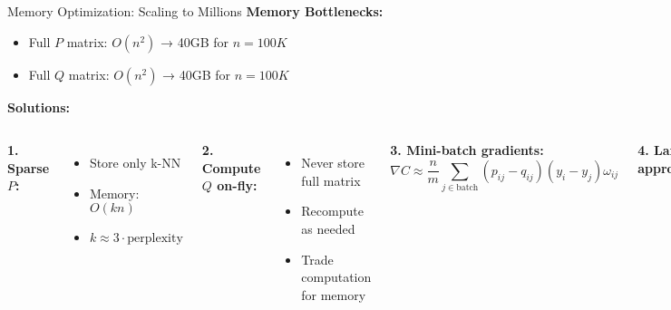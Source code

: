 \documentclass[aspectratio=169]{beamer}
\begin{document}
\begin{frame}{Memory Optimization: Scaling to Millions}
\textbf{Memory Bottlenecks:}
\begin{itemize}
\item Full $P$ matrix: $O(n^2)$ → 40GB for $n=100K$
\item Full $Q$ matrix: $O(n^2)$ → 40GB for $n=100K$
\end{itemize}

\textbf{Solutions:}
\begin{columns}
\textbf{1. Sparse $P$:}
\begin{itemize}
\item Store only k-NN
\item Memory: $O(kn)$
\item $k \approx 3 \cdot \text{perplexity}$
\end{itemize}

\textbf{2. Compute $Q$ on-fly:}
\begin{itemize}
\item Never store full matrix
\item Recompute as needed
\item Trade computation for memory
\end{itemize}

\textbf{3. Mini-batch gradients:}
$$\nabla C \approx \frac{n}{m}\sum_{j \in \text{batch}} (p_{ij} - q_{ij})(y_i - y_j)\omega_{ij}$$

\textbf{4. Landmark approximation:}
\begin{itemize}
\item Select $L \ll n$ landmarks
\item Approximate others
\item Memory: $O(Ln)$
\end{itemize}
\end{columns}
\end{frame}
\end{document}
